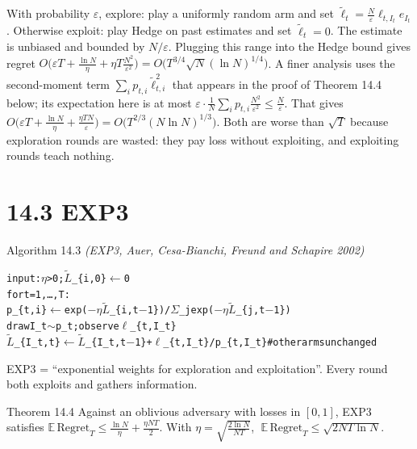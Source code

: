 \documentclass[11pt,a4paper,openany]{book}
\newcommand{\E}{\mathbb{E}}
\newcommand{\eps}{\varepsilon}
\newcommand{\Reg}{\mathrm{Regret}}
\newenvironment{algo}{\par\smallskip\begingroup\footnotesize\begin{alltt}}{\end{alltt}\endgroup\smallskip}
\begin{document}
With probability $\eps$, explore: play a uniformly random arm and set $\tilde\ell_t=\frac{N}{\eps}\ell_{t,I_t}e_{I_t}$. Otherwise exploit: play Hedge on past estimates and set $\tilde\ell_t=0$. The estimate is unbiased and bounded by $N/\eps$. Plugging this range into the Hedge bound gives regret $O\big(\eps T+\frac{\ln N}\eta+\eta T\frac{N^2}{\eps^2}\big)=O\big(T^{3/4}\sqrt N(\ln N)^{1/4}\big)$. A finer analysis uses the second-moment term $\sum_ip_{t,i}\tilde\ell_{t,i}^2$ that appears in the proof of Theorem 14.4 below; its expectation here is at most $\eps\cdot\frac1N\sum_ip_{t,i}\frac{N^2}{\eps^2}\le\frac N\eps$. That gives $O\big(\eps T+\frac{\ln N}\eta+\frac{\eta TN}{\eps}\big)=O\big(T^{2/3}(N\ln N)^{1/3}\big)$. Both are worse than $\sqrt T$ because exploration rounds are wasted: they pay loss without exploiting, and exploiting rounds teach nothing.

\section*{14.3 EXP3}\label{ch14-exp3}

\begin{balg}{Algorithm 14.3 \emph{(EXP3, Auer, Cesa-Bianchi, Freund and Schapire 2002)}}
\begin{algo}
input: \ensuremath{\eta} > 0;  \ensuremath{\tilde{L}}\_\{i,0\} \ensuremath{\leftarrow} 0
for t = 1, …, T:
    p\_\{t,i\} \ensuremath{\leftarrow} exp(\ensuremath{-}\ensuremath{\eta} \ensuremath{\tilde{L}}\_\{i,t\ensuremath{-}1\}) / \ensuremath{\Sigma}\_j exp(\ensuremath{-}\ensuremath{\eta} \ensuremath{\tilde{L}}\_\{j,t\ensuremath{-}1\})
    draw I\_t \ensuremath{\sim} p\_t;  observe \ensuremath{\ell}\_\{t,I\_t\}
    \ensuremath{\tilde{L}}\_\{I\_t,t\} \ensuremath{\leftarrow} \ensuremath{\tilde{L}}\_\{I\_t,t\ensuremath{-}1\} + \ensuremath{\ell}\_\{t,I\_t\} / p\_\{t,I\_t\}      \# other arms unchanged
\end{algo}

EXP3 = ``exponential weights for exploration and exploitation''. Every round both exploits and gathers information.
\end{balg}

\begin{bthm}{Theorem 14.4}
Against an oblivious adversary with losses in $[0,1]$, EXP3 satisfies $\E\,\Reg_T\le\frac{\ln N}{\eta}+\frac{\eta NT}{2}$. With $\eta=\sqrt{\frac{2\ln N}{NT}}$, $\;\E\,\Reg_T\le\sqrt{2NT\ln N}$.
\end{bthm}
\end{document}
